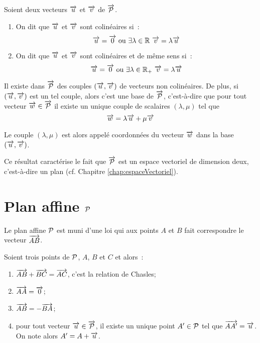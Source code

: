\begin{defdef}
  Soient deux vecteurs $\vu$ et $\vv$ de $\vect{\P}$.
  \begin{enumerate}
    \item On dit que $\vu$ et $\vv$ sont colinéaires si~:
      \begin{equation}
        \vu = \vect{0} \text{ ou } \exists \lambda \in \R \ \vv=\lambda\vu
      \end{equation}
    \item On dit que $\vu$ et $\vv$ sont colinéaires et de même sens si~:
      \begin{equation}
        \vu = \vect{0} \text{ ou } \exists \lambda \in \R_+ \ \vv=\lambda\vu
      \end{equation}
  \end{enumerate}
\end{defdef}

\begin{prop}
  Il existe dans $\vect{\P}$ des couples $(\vu,\vv)$ de vecteurs non 
  colinéaires. De plus, si $(\vu,\vv)$ est un tel couple, alors c'est une base 
  de $\vect{\P}$, c'est-à-dire que pour tout vecteur $\vw \in \vect{\P}$ il 
  existe un unique couple de scalaires $(\lambda, \mu)$ tel que
  \begin{equation}
    \vw=\lambda \vu + \mu \vv
  \end{equation}
\end{prop}

\begin{defdef}
  Le couple $(\lambda,\mu)$ est alors appelé coordonnées du vecteur $\vw$ dans 
  la base $(\vu,\vv)$.
\end{defdef}

Ce résultat caractérise le fait que $\vect{\P}$ est un espace vectoriel de 
dimension deux, c'est-à-dire un plan (cf. Chapitre \ref{chap:espaceVectoriel}).

\section{Plan affine $\P$}

Le plan affine $\P$ est muni d'une loi qui aux points $A$ et $B$ fait 
correspondre le vecteur $\vect{AB}$.

\begin{prop}
  Soient trois points de $\P$, $A$, $B$ et $C$ et alors~:
  \begin{enumerate}
    \item $\vect{AB}+\vect{BC}=\vect{AC}$, c'est la relation de Chasles;
    \item $\vect{AA}=\vect{0}$;
    \item $\vect{AB}=-\vect{BA}$;
    \item pour tout vecteur $\vu \in \vect{\P}$, il existe un unique point $A' 
      \in \P$ tel que $\vect{AA'}=\vu$. On note alors $A'=A+\vu$.
  \end{enumerate}
\end{prop}

